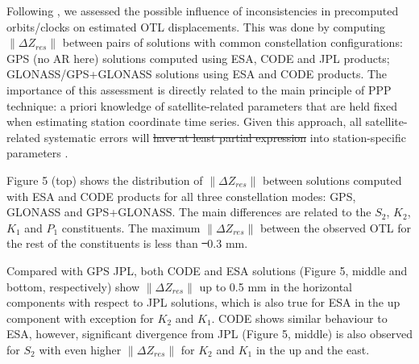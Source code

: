 \documentclass[se, manuscript]{copernicus}
\providecommand{\DIFadd}[1]{{\protect\color{blue}\uwave{#1}}} %
\providecommand{\DIFdel}[1]{{\protect\color{red}\sout{#1}}}                      %
\providecommand{\DIFaddbegin}{} %
\providecommand{\DIFaddend}{} %
\providecommand{\DIFdelbegin}{} %
\providecommand{\DIFdelend}{} %
\begin{document}
Following \cite{Yuan2013}, we assessed the possible influence of inconsistencies in precomputed orbits/clocks on estimated OTL displacements. This was done by computing $\|\Delta Z_{res}\|$ between pairs of solutions with common constellation configurations: GPS (no AR here) solutions computed using ESA, CODE and JPL products; GLONASS/GPS+GLONASS solutions using ESA and CODE products. The importance of this assessment is directly related to the main principle of PPP technique: a priori knowledge of satellite-related parameters that are held fixed when estimating station coordinate time series. Given this approach, all satellite-related systematic errors will \DIFdelbegin \DIFdel{have at least partial expression }\DIFdelend \DIFaddbegin \DIFadd{partially propagate }\DIFaddend into station-specific parameters \citep{Yuan2013}.

Figure 5 (top) shows the distribution of $\|\Delta Z_{res}\|$ between solutions computed with ESA and CODE products for all three constellation modes: GPS, GLONASS and GPS+GLONASS. The main differences are related to the $S_2$, $K_2$, $K_1$ and $P_1$ constituents. The maximum $\|\Delta Z_{res}\|$ between the observed OTL for the rest of the constituents is less than \DIFdelbegin \DIFdel{~}\DIFdelend \DIFaddbegin \DIFadd{$\sim$}\DIFaddend 0.3 mm.

Compared with GPS JPL, both CODE and ESA solutions (Figure 5, middle and bottom, respectively) show $\|\Delta Z_{res}\|$ up to 0.5 mm in the horizontal components with respect to JPL solutions, which is also true for ESA in the up component with exception for $K_2$ and $K_1$. CODE shows similar behaviour to ESA, however, significant divergence from JPL (Figure 5, middle) is also observed for $S_2$ with even higher $\|\Delta Z_{res}\|$ for $K_2$ and $K_1$ in the up and the east.
\end{document}
